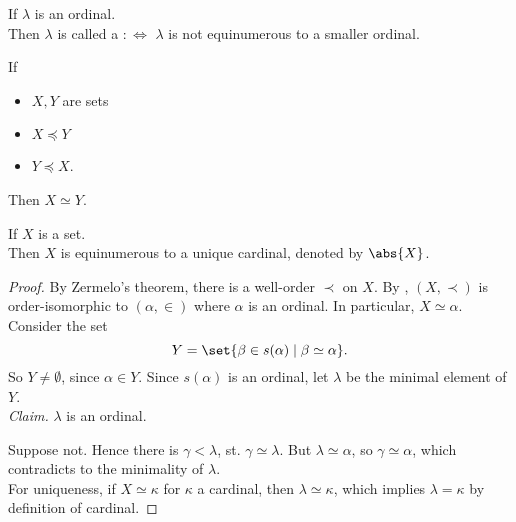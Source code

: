 \begin{definition}
    If $\lambda$ is an ordinal.\\
    Then $\lambda$ is called a  $:\iff$ $\lambda$ is not equinumerous to a smaller ordinal.
\end{definition}

\begin{theorem}
    If
    \begin{itemize}
        \item $X,Y$ are sets
        \item $X \preceq Y$
        \item $Y \preceq X$.
    \end{itemize}
    Then $X \simeq Y$.
\end{theorem}

\begin{proposition}
    If $X$ is a set.\\
    Then $X$ is equinumerous to a unique cardinal, denoted by $\abs{X}$.
\end{proposition}
\begin{proof}
    By Zermelo's theorem, there is a well-order $\prec$ on $X$. By , $(X, \prec)$ is order-isomorphic to $(\alpha, \in)$
    where $\alpha$ is an ordinal. In particular, $X \simeq \alpha$.\\
    Consider the set $$ Y = \set{\beta \in s(\alpha) \mid \beta \simeq \alpha}.$$
    So $Y \ne \emptyset$, since $\alpha \in Y$. Since $s(\alpha)$ is an ordinal, let $\lambda$ be the minimal element of $Y$.\\
    \emph{Claim.} $\lambda$ is an ordinal.

    Suppose not. Hence there is $\gamma < \lambda$, st. $\gamma \simeq \lambda$. 
    But $\lambda \simeq \alpha$, so $\gamma \simeq \alpha$, which contradicts to the minimality of $\lambda$.\\
    For uniqueness, if $X \simeq \kappa$ for $\kappa$ a cardinal, then $\lambda \simeq \kappa$, which implies $\lambda = \kappa$ by definition of cardinal.
\end{proof}
